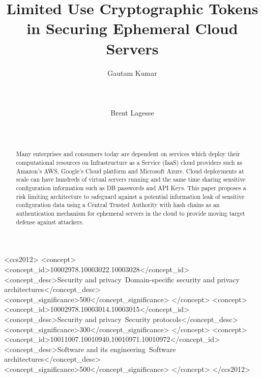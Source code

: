 \documentclass{sig-alternate-05-2015}
\begin{document}
\title{Limited Use Cryptographic Tokens in Securing Ephemeral Cloud Servers}

\author{
%
%
\alignauthor
Gautam Kumar\\
       \\
       \\
       \\
\alignauthor
Brent Lagesse\\
       \\
       \\
}



\maketitle


\begin{abstract}

Many enterprises and consumers today are dependent on services which deploy their computational resources on Infrastructure as a Service (IaaS) cloud providers such as Amazon's AWS, Google's Cloud platform and Microsoft Azure. Cloud deployments at scale can have hundreds of virtual servers running and the same time sharing sensitive configuration information such as DB passwords and API Keys. This paper proposes a risk limiting architecture to safeguard against a potential information leak of sensitive configuration data using a Central Trusted Authority with hash chains as an authentication mechanism for ephemeral servers in the cloud to provide moving target defense against attackers.
\end{abstract}


\begin{CCSXML}
<ccs2012>
<concept>
<concept_id>10002978.10003022.10003028</concept_id>
<concept_desc>Security and privacy~Domain-specific security and privacy architectures</concept_desc>
<concept_significance>500</concept_significance>
</concept>
<concept>
<concept_id>10002978.10003014.10003015</concept_id>
<concept_desc>Security and privacy~Security protocols</concept_desc>
<concept_significance>300</concept_significance>
</concept>
<concept>
<concept_id>10011007.10010940.10010971.10010972</concept_id>
<concept_desc>Software and its engineering~Software architectures</concept_desc>
<concept_significance>500</concept_significance>
</concept>
</ccs2012>
\end{CCSXML}
\end{document}
